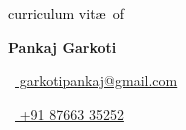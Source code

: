 \begin{footnotesize}
	 \textcolor{black}{curriculum vit\ae~of}
\end{footnotesize}

\vspace*{-0.10em}
\begin{Huge}
	\textbf{Pankaj Garkoti}
\end{Huge}

\begin{footnotesize}
	\quad \begin{small}\faEnvelope[regular]\end{small}~\href{mailto:garkotipankaj@gmail.com} {%
	    \large garkotipankaj@gmail.com
	}

	\begin{tiny}\faMobile*\end{tiny}~\href{tel:8766335252}{
		\large +91 87663 35252
	}
	\quad
\end{footnotesize}
